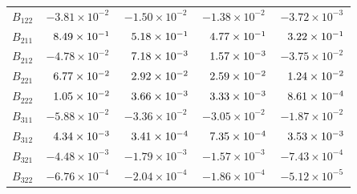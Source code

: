 \begin{table}
{\begin{tabular}{|l|c|c|c|c|}
			$ B_{122} $ & $           -3.81 \times 10^{-2} $  & $           -1.50 \times 10^{-2} $ &  $           -1.38 \times 10^{-2} $ & $           -3.72 \times 10^{-3} $ \\
			$ B_{211} $ & $\hphantom{-}8.49 \times 10^{-1} $  & $\hphantom{-}5.18 \times 10^{-1} $ &  $\hphantom{-}4.77 \times 10^{-1} $ & $\hphantom{-}3.22 \times 10^{-1} $ \\
			$ B_{212} $ & $           -4.78 \times 10^{-2} $  & $\hphantom{-}7.18 \times 10^{-3} $ &  $\hphantom{-}1.57 \times 10^{-3} $ & $           -3.75 \times 10^{-2} $ \\
			$ B_{221} $ & $\hphantom{-}6.77 \times 10^{-2} $  & $\hphantom{-}2.92 \times 10^{-2} $ &  $\hphantom{-}2.59 \times 10^{-2} $ & $\hphantom{-}1.24 \times 10^{-2} $ \\
			$ B_{222} $ & $\hphantom{-}1.05 \times 10^{-2} $  & $\hphantom{-}3.66 \times 10^{-3} $ &  $\hphantom{-}3.33 \times 10^{-3} $ & $\hphantom{-}8.61 \times 10^{-4} $ \\
			$ B_{311} $ & $           -5.88 \times 10^{-2} $  & $           -3.36 \times 10^{-2} $ &  $           -3.05 \times 10^{-2} $ & $           -1.87 \times 10^{-2} $ \\
			$ B_{312} $ & $\hphantom{-}4.34 \times 10^{-3} $  & $\hphantom{-}3.41 \times 10^{-4} $ &  $\hphantom{-}7.35 \times 10^{-4} $ & $\hphantom{-}3.53 \times 10^{-3} $ \\
			$ B_{321} $ & $           -4.48 \times 10^{-3} $  & $           -1.79 \times 10^{-3} $ &  $           -1.57 \times 10^{-3} $ & $           -7.43 \times 10^{-4} $ \\
			$ B_{322} $ & $           -6.76 \times 10^{-4} $  & $           -2.04 \times 10^{-4} $ &  $           -1.86 \times 10^{-4} $ & $           -5.12 \times 10^{-5} $ \\
			\hline
		\end{tabular}	
		\label{tab:BeamBCoefficients}
	}
\end{table}

